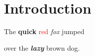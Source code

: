 \section{Introduction}

The \textbf{quick} \textcolor{red}{red} \textit{fox} jumped

over the \textbf{\textit{lazy}} brown dog.